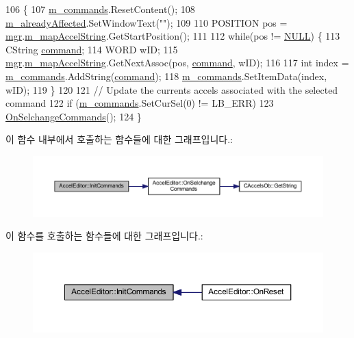 \begin{DoxyCode}
106 \{
107   \mbox{\hyperlink{class_accel_editor_aba4ea3d3eced08de9fe39e307b5f40fc}{m\_commands}}.ResetContent();
108   \mbox{\hyperlink{class_accel_editor_ac3d2378be850611ee51689bd34475275}{m\_alreadyAffected}}.SetWindowText(\textcolor{stringliteral}{""});
109 
110   POSITION pos = \mbox{\hyperlink{class_accel_editor_acb731e2193cb5022a95e83122651f96d}{mgr}}.\mbox{\hyperlink{class_c_accelerator_manager_abb40dbb1a44c47ac22590e8f1243835b}{m\_mapAccelString}}.GetStartPosition();
111   
112   \textcolor{keywordflow}{while}(pos != \mbox{\hyperlink{getopt1_8c_a070d2ce7b6bb7e5c05602aa8c308d0c4}{NULL}}) \{
113     CString \mbox{\hyperlink{_commands_8cpp_a9f83d3c4b4c3bb790f90ad79865e37ab}{command}};
114     WORD wID;
115     \mbox{\hyperlink{class_accel_editor_acb731e2193cb5022a95e83122651f96d}{mgr}}.\mbox{\hyperlink{class_c_accelerator_manager_abb40dbb1a44c47ac22590e8f1243835b}{m\_mapAccelString}}.GetNextAssoc(pos, \mbox{\hyperlink{_commands_8cpp_a9f83d3c4b4c3bb790f90ad79865e37ab}{command}}, wID);
116 
117     \textcolor{keywordtype}{int} index = \mbox{\hyperlink{class_accel_editor_aba4ea3d3eced08de9fe39e307b5f40fc}{m\_commands}}.AddString(\mbox{\hyperlink{_commands_8cpp_a9f83d3c4b4c3bb790f90ad79865e37ab}{command}});
118     \mbox{\hyperlink{class_accel_editor_aba4ea3d3eced08de9fe39e307b5f40fc}{m\_commands}}.SetItemData(index, wID);
119   \}
120 
121   \textcolor{comment}{// Update the currents accels associated with the selected command}
122   \textcolor{keywordflow}{if} (\mbox{\hyperlink{class_accel_editor_aba4ea3d3eced08de9fe39e307b5f40fc}{m\_commands}}.SetCurSel(0) != LB\_ERR)
123     \mbox{\hyperlink{class_accel_editor_a16cb5c73f55199115c5a4f35268ff3fa}{OnSelchangeCommands}}();
124 \}
\end{DoxyCode}
이 함수 내부에서 호출하는 함수들에 대한 그래프입니다.\+:
\nopagebreak
\begin{figure}[H]
\begin{center}
\leavevmode
\includegraphics[width=350pt]{class_accel_editor_a3c882fb85c72711e26cfe800fb11ccfa_cgraph}
\end{center}
\end{figure}
이 함수를 호출하는 함수들에 대한 그래프입니다.\+:
\nopagebreak
\begin{figure}[H]
\begin{center}
\leavevmode
\includegraphics[width=350pt]{class_accel_editor_a3c882fb85c72711e26cfe800fb11ccfa_icgraph}
\end{center}
\end{figure}
